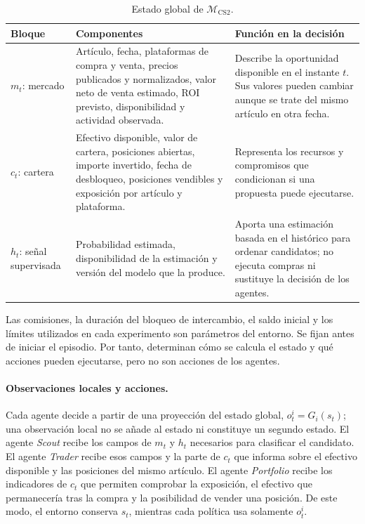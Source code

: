 \begin{table}[H]
\centering
\caption{Estado global de $\mathcal{M}_{\mathrm{CS2}}$.}
\label{tab:componentes-estado-marl}
\begin{tabularx}{\textwidth}{@{}p{}p{}X@{}}
\toprule
\textbf{Bloque} & \textbf{Componentes} & \textbf{Función en la decisión} \\
\midrule
$m_t$: mercado & Artículo, fecha, plataformas de compra y venta, precios publicados y normalizados, valor neto de venta estimado, ROI previsto, disponibilidad y actividad observada. & Describe la oportunidad disponible en el instante $t$. Sus valores pueden cambiar aunque se trate del mismo artículo en otra fecha. \\
$c_t$: cartera & Efectivo disponible, valor de cartera, posiciones abiertas, importe invertido, fecha de desbloqueo, posiciones vendibles y exposición por artículo y plataforma. & Representa los recursos y compromisos que condicionan si una propuesta puede ejecutarse. \\
$h_t$: señal supervisada & Probabilidad estimada, disponibilidad de la estimación y versión del modelo que la produce. & Aporta una estimación basada en el histórico para ordenar candidatos; no ejecuta compras ni sustituye la decisión de los agentes. \\
\bottomrule
\end{tabularx}
\end{table}

Las comisiones, la duración del bloqueo de intercambio, el saldo inicial y los límites utilizados en cada experimento son parámetros del entorno. Se fijan antes de iniciar el episodio. Por tanto, determinan cómo se calcula el estado y qué acciones pueden ejecutarse, pero no son acciones de los agentes.

\paragraph{Observaciones locales y acciones.}
Cada agente decide a partir de una proyección del estado global, $o_t^i=G_i(s_t)$; una observación local no se añade al estado ni constituye un segundo estado. El agente \textit{Scout} recibe los campos de $m_t$ y $h_t$ necesarios para clasificar el candidato. El agente \textit{Trader} recibe esos campos y la parte de $c_t$ que informa sobre el efectivo disponible y las posiciones del mismo artículo. El agente \textit{Portfolio} recibe los indicadores de $c_t$ que permiten comprobar la exposición, el efectivo que permanecería tras la compra y la posibilidad de vender una posición. De este modo, el entorno conserva $s_t$, mientras cada política usa solamente $o_t^i$.

